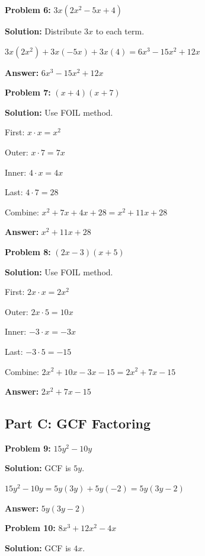 \documentclass[12pt]{article}
\begin{document}
		\textbf{Problem 6:} $3x(2x^2 - 5x + 4)$
		
		\textbf{Solution:} Distribute $3x$ to each term.
		
		$3x(2x^2) + 3x(-5x) + 3x(4) = 6x^3 - 15x^2 + 12x$
		
		\textbf{Answer:} $6x^3 - 15x^2 + 12x$

		\vspace{0.5cm}

		\textbf{Problem 7:} $(x + 4)(x + 7)$
		
		\textbf{Solution:} Use FOIL method.
		
		First: $x \cdot x = x^2$
		
		Outer: $x \cdot 7 = 7x$
		
		Inner: $4 \cdot x = 4x$
		
		Last: $4 \cdot 7 = 28$
		
		Combine: $x^2 + 7x + 4x + 28 = x^2 + 11x + 28$
		
		\textbf{Answer:} $x^2 + 11x + 28$

		\vspace{0.5cm}

		\textbf{Problem 8:} $(2x - 3)(x + 5)$
		
		\textbf{Solution:} Use FOIL method.
		
		First: $2x \cdot x = 2x^2$
		
		Outer: $2x \cdot 5 = 10x$
		
		Inner: $-3 \cdot x = -3x$
		
		Last: $-3 \cdot 5 = -15$
		
		Combine: $2x^2 + 10x - 3x - 15 = 2x^2 + 7x - 15$
		
		\textbf{Answer:} $2x^2 + 7x - 15$

	\newpage

	\subsection*{Part C: GCF Factoring}

		\textbf{Problem 9:} $15y^2 - 10y$
		
		\textbf{Solution:} GCF is $5y$.
		
		$15y^2 - 10y = 5y(3y) + 5y(-2) = 5y(3y - 2)$
		
		\textbf{Answer:} $5y(3y - 2)$

		\vspace{0.5cm}

		\textbf{Problem 10:} $8x^3 + 12x^2 - 4x$
		
		\textbf{Solution:} GCF is $4x$.
		
\end{document}
